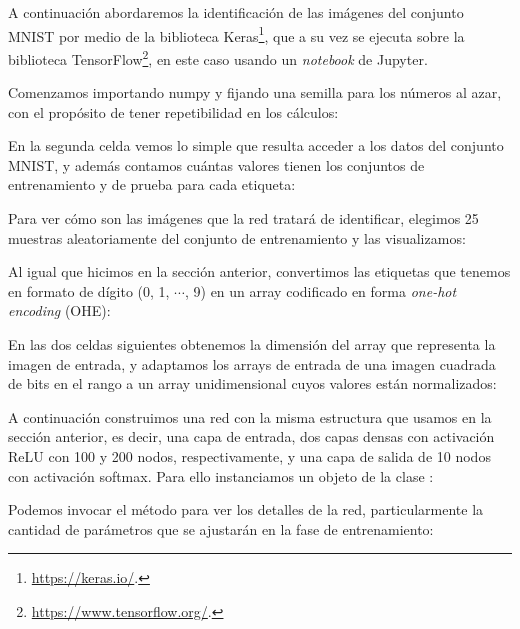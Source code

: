 A continuación abordaremos la identificación de las imágenes del conjunto MNIST por medio de la biblioteca Keras\footnote{\url{https://keras.io/}.}, que a su vez se ejecuta sobre la biblioteca TensorFlow\footnote{\url{https://www.tensorflow.org/}.}, en este caso usando un \textit{notebook} de Jupyter.

Comenzamos importando numpy y fijando una semilla para los números al azar, con el propósito de tener repetibilidad en los cálculos:


En la segunda celda vemos lo simple que resulta acceder a los datos del conjunto MNIST, y además contamos cuántas valores tienen los conjuntos de entrenamiento y de prueba para cada etiqueta:


Para ver cómo son las imágenes que la red tratará de identificar, elegimos 25 muestras aleatoriamente del conjunto de entrenamiento y las visualizamos:


Al igual que hicimos en la sección anterior, convertimos las etiquetas que tenemos en formato de dígito (0, 1, $\cdots$, 9) en un array codificado en forma \textit{one-hot encoding} (OHE):


En las dos celdas siguientes obtenemos la dimensión del array que representa la imagen de entrada, y adaptamos los arrays de entrada de una imagen cuadrada de bits en el rango \mip{[0, 255]} a un array unidimensional cuyos valores están normalizados:


A continuación construimos una red con la misma estructura que usamos en la sección anterior, es decir, una capa de entrada, dos capas densas con activación ReLU con 100 y 200 nodos, respectivamente, y una capa de salida de 10 nodos con activación softmax. Para ello instanciamos un objeto  de la clase :


Podemos invocar el método  para ver los detalles de la red, particularmente la cantidad de parámetros que se ajustarán en la fase de entrenamiento:

